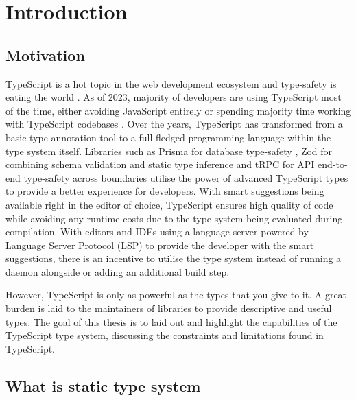 \chapter{Introduction}

\section{Motivation}

TypeScript is a hot topic in the web development ecosystem and type-safety is eating the world \cite{jsworldconferenceFredSchottTypesafety2023}. As of 2023, majority of developers are using TypeScript most of the time, either avoiding JavaScript entirely or spending majority time working with TypeScript codebases \cite{StateJS2022}. Over the years, TypeScript has transformed from a basic type annotation tool to a full fledged programming language within the type system itself. Libraries such as Prisma for database type-safety \cite{PrismaPrismaNextgeneration}, Zod for combining schema validation and static type inference \cite{mcdonnellZod2023} and tRPC for API end-to-end type-safety across boundaries \cite{TRPC2023} utilise the power of advanced TypeScript types to provide a better experience for developers. With smart suggestions being available right in the editor of choice, TypeScript ensures high quality of code while avoiding any runtime costs due to the type system being evaluated during compilation. With editors and IDEs using a language server powered by Language Server Protocol (LSP) to provide the developer with the smart suggestions, there is an incentive to utilise the type system instead of running a daemon alongside or adding an additional build step.

However, TypeScript is only as powerful as the types that you give to it. A great burden is laid to the maintainers of libraries to provide descriptive and useful types. The goal of this thesis is to laid out and highlight the capabilities of the TypeScript type system, discussing the constraints and limitations found in TypeScript. 

\section{What is static type system}

